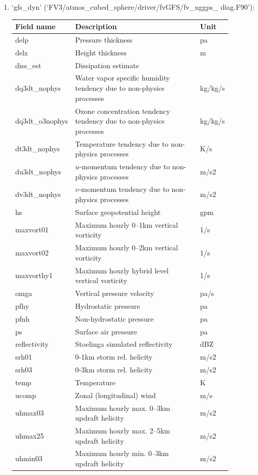 \documentclass[11pt,fleqn]{report}              %
\begin{document}
\begin{enumerate}
\begin{enumerate}
\item `gfs\_dyn' (`FV3/atmos\_cubed\_sphere/driver/fvGFS/fv\_nggps\_ diag.F90'):
{
\scriptsize
\begin{longtable}{ p{0.17\linewidth} | p{0.6\linewidth} | p{0.11\linewidth} }
\hline
\hline
Field name & Description & Unit \\
\hline
delp & Pressure thickness & pa  \\
delz & Height thickness & m  \\
diss\_est & Dissipation estimate & \\
dq3dt\_nophys & Water vapor specific humidity tendency due to non-physics processes &  kg/kg/s\\
dq3dt\_o3nophys & Ozone concentration tendency tendency due to non-physics processes &  kg/kg/s \\
dt3dt\_nophys & Temperature tendency due to non-physics processes & K/s \\
du3dt\_nophys & $u$-momentum tendency due to non-physics processes & m/s2 \\
dv3dt\_nophys & $v$-momentum tendency due to non-physics processes & m/s2 \\ 
hs & Surface geopotential height & gpm  \\
maxvort01 & Maximum hourly 0--1km vertical vorticity & 1/s  \\
maxvort02 & Maximum hourly 0--2km vertical vorticity & 1/s  \\
maxvorthy1 & Maximum hourly hybrid level vertical vorticity & 1/s  \\
omga & Vertical pressure velocity & pa/s \\
pfhy & Hydrostatic pressure & pa \\
pfnh & Non-hydrostatic pressure & pa \\
ps & Surface air pressure & pa  \\
reflectivity & Stoelinga simulated reflectivity & dBZ \\
srh01 & 0-1km storm rel. helicity & m/s2 \\
srh03 & 0-3km storm rel. helicity & m/s2 \\
temp & Temperature & K  \\
ucomp & Zonal (longitudinal) wind & m/s \\
uhmax03 & Maximum hourly max. 0--3km updraft helicity & m/s2  \\
uhmax25 & Maximum hourly max. 2--5km updraft helicity & m/s2  \\
uhmin03 & Maximum hourly min. 0--3km updraft helicity & m/s2  \\

\end{longtable}}
\end{enumerate}
\end{enumerate}
\end{document}
